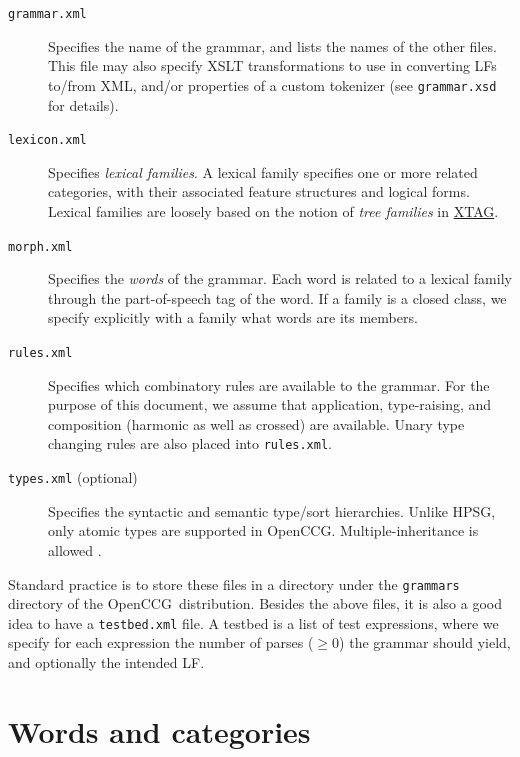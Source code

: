 \documentclass[11pt]{article}
\newcommand{\occg}{OpenCCG}
\begin{document}
\begin{description}

\item[\texttt{grammar.xml}] Specifies the name of the grammar, and lists
the names of the other files.  This file may also specify XSLT
transformations to use in converting LFs to/from XML, and/or properties
of a custom tokenizer (see \texttt{grammar.xsd} for details).
      
\item[\texttt{lexicon.xml}] Specifies \emph{lexical families}. A lexical
family specifies one or more related categories, with their associated
feature structures and logical forms. Lexical families are loosely based
on the notion of \emph{tree families} in
\href{http://www.cis.upenn.edu/~xtag/}{XTAG}.
      
\item[\texttt{morph.xml}] Specifies the \emph{words} of the grammar.
Each word is related to a lexical family through the part-of-speech tag
of the word. If a family is a closed class, we specify explicitly with a
family what words are its members.

\item[\texttt{rules.xml}] Specifies which combinatory rules are
available to the grammar. For the purpose of this document, we assume
that application, type-raising, and composition (harmonic as well as
crossed) are available. Unary type changing rules are also placed into
\texttt{rules.xml}.

\item[\texttt{types.xml} (optional)] Specifies the syntactic and semantic
type/sort hierarchies. Unlike HPSG, only atomic types are
supported in \occg. Multiple-inheritance is allowed \cite{erkanms03}.
      
\end{description}

Standard practice is to store these files in a directory under the
\texttt{grammars} directory of the \occg\ distribution. Besides the
above files, it is also a good idea to have a \texttt{testbed.xml} file.
A testbed is a list of test expressions, where we specify for each
expression the number of parses ($\geq 0$) the grammar should yield, and
optionally the intended LF.


\section{Words and categories}
\label{sec:cats}
\end{document}
